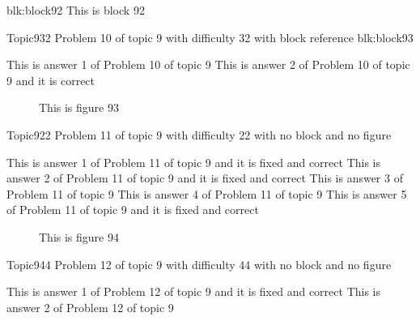 \documentclass[master]{exam}
\begin{document}
\begin{block}{blk:block92}
This is block 92
\end{block}


\begin{problem}[requires=blk:block93]{Topic9}{32}
	Problem 10 of topic 9 with difficulty 32 with block reference blk:block93
	\begin{answers}
		\answer This is answer 1 of Problem 10 of topic 9 
		\answer[correct] This is answer 2 of Problem 10 of topic 9 and it is correct
	\end{answers}
\end{problem}



\begin{figure}
	\begin{center}
		This is figure 93 
		\label{fig:figure93}
	\end{center}
\end{figure}

\begin{problem}{Topic9}{22}
	Problem 11 of topic 9 with difficulty 22 with no block and no figure
	\begin{answers}
		 This is answer 1 of Problem 11 of topic 9 and it is fixed and correct
		 This is answer 2 of Problem 11 of topic 9 and it is fixed and correct
		\answer This is answer 3 of Problem 11 of topic 9 
		\answer This is answer 4 of Problem 11 of topic 9 
		 This is answer 5 of Problem 11 of topic 9 and it is fixed and correct
	\end{answers}
\end{problem}



\begin{figure}
	\begin{center}
		This is figure 94 
		\label{fig:figure94}
	\end{center}
\end{figure}

\begin{problem}{Topic9}{44}
	Problem 12 of topic 9 with difficulty 44 with no block and no figure
	\begin{answers}
		 This is answer 1 of Problem 12 of topic 9 and it is fixed and correct
		\answer This is answer 2 of Problem 12 of topic 9 
	\end{answers}
\end{problem}
\end{document}
